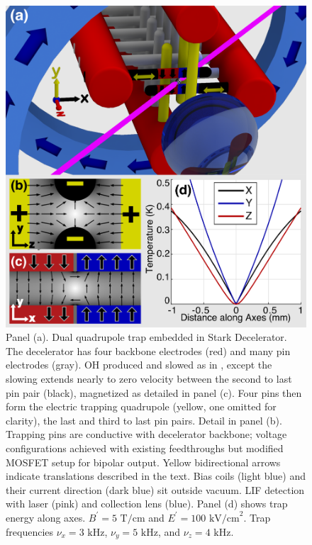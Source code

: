 \documentclass[%
 reprint,
 amsmath,amssymb,
 aps,
prl,
]{revtex4-1}
\begin{document}
\begin{figure}[tb]
\includegraphics[width=\linewidth]{Geometry/CAD_recolor_laser_panels.PNG}%
\caption{
Panel (a). Dual quadrupole trap embedded in Stark Decelerator. The decelerator has four backbone electrodes (red) and many pin electrodes (gray). OH produced and slowed as in \cite{Sawyer2008}, except the slowing extends nearly to zero velocity between the second to last pin pair (black), magnetized as detailed in panel (c). Four pins then form the electric trapping quadrupole (yellow, one omitted for clarity), the last and third to last pin pairs. Detail in panel (b). Trapping pins are conductive with decelerator backbone; voltage configurations achieved with existing feedthroughs but modified MOSFET setup for bipolar output. Yellow bidirectional arrows indicate translations described in the text. Bias coils (light blue) and their current direction (dark blue) sit outside vacuum. LIF detection with laser (pink) and collection lens (blue). Panel (d) shows trap energy along axes. $B^\prime=5\text{ T/cm}$ and $E^\prime=100 \text{ kV/cm}^2$. Trap frequencies $\nu_x=3\text{ kHz}$, $\nu_y=5\text{ kHz}$, and $\nu_z=4\text{ kHz}$.\label{fig:CAD}}
\end{figure}
\end{document}
